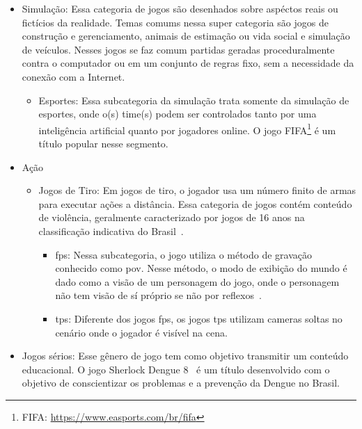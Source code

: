 \begin{itemize}
    \begin{itemize}
      \item Ação e Aventura: Esse gênero herda características da categoria de Ação e Aventura. O jogador é imerso em um mundo para iteragir com o ambiente e com \ac{npcs}, além de se preocupar com a movimentação no cenário. Um grande título desse gênero é a série de jogos nomeada The Legend of Zelda\footnote{The Legend of Zelda: \url{https://www.zelda.com/}}.
    \end{itemize}
  \item Simulação: Essa categoria de jogos são desenhados sobre aspéctos reais ou fictícios da realidade. Temas comums nessa super categoria são jogos de construção e gerenciamento, animais de estimação ou vida social e simulação de veículos. Nesses jogos se faz comum partidas geradas proceduralmente contra o computador ou em um conjunto de regras fixo, sem a necessidade da conexão com a Internet.
    \begin{itemize}
      \item Esportes: Essa subcategoria da simulação trata somente da simulação de esportes, onde o(s) time(s) podem ser controlados tanto por uma inteligência artificial quanto por jogadores online. O jogo FIFA\footnote{FIFA: \url{https://www.easports.com/br/fifa}} é um título popular nesse segmento.
    \end{itemize}
  \item Ação
    \begin{itemize}
      \item Jogos de Tiro: Em jogos de tiro, o jogador usa um número finito de armas para executar ações a distância. Essa categoria de jogos contém conteúdo de violência, geralmente caracterizado por jogos de 16 anos na classificação indicativa do Brasil~\cite{trindade2018Apr}.
        \begin{itemize}
          \item \ac{fps}: Nessa subcategoria, o jogo utiliza o método de gravação conhecido como \ac{pov}. Nesse método, o modo de exibição do mundo é dado como a visão de um personagem do jogo, onde o personagem não tem visão de sí próprio se não por reflexos~\cite{video_game_technologies}.
          \item \ac{tps}: Diferente dos jogos \ac{fps}, os jogos \ac{tps} utilizam cameras soltas no cenário onde o jogador é visível na cena.
        \end{itemize}
    \end{itemize}
  \item Jogos sérios: Esse gênero de jogo tem como objetivo transmitir um conteúdo educacional. O jogo Sherlock Dengue 8~\cite{sherlock_dengue} é um título desenvolvido com o objetivo de conscientizar os problemas e a prevenção da Dengue no Brasil.
\end{itemize}


